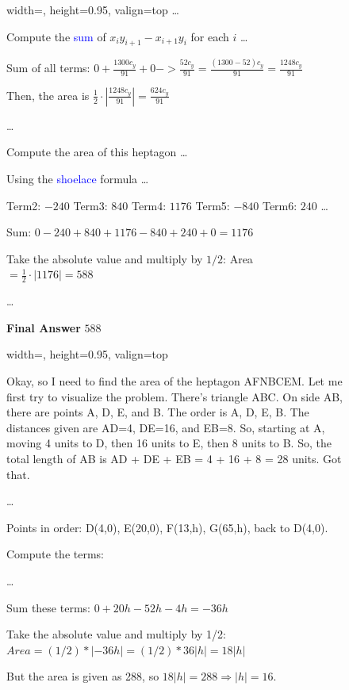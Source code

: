 \begin{figure}[t]
\begin{minipage}[t]{0.32\textwidth}
\begin{bluebox}{width=\linewidth,  
height=0.95\textheight,  valign=top}
\ldots

Compute the \textcolor{blue}{sum} of $x_i y_{i+1} - x_{i+1} y_i$ for each $i$ \ldots

Sum of all terms: $0 + \frac{1300 c_y}{91} + 0  -> \frac{52 c_y}{91} = \frac{(1300 - 52)c_y}{91} = \frac{1248 c_y}{91}$

Then, the area is $\frac{1}{2} \cdot \left|\frac{1248 c_y}{91}\right| = \frac{624 c_y}{91}$

\ldots

Compute the area of this heptagon \ldots 

Using the \textcolor{blue}{shoelace} formula \ldots

Term2: $-\!240$ \quad Term3: $840$ \quad Term4: $1176$ \quad Term5: $-\!840$ \quad Term6: $240$ \ldots

Sum: $0 - 240 + 840 + 1176 - 840 + 240 + 0 = 1176$

Take the absolute value and multiply by $1/2$:
Area $= \frac{1}{2}\cdot |1176| = 588$

\ldots

\textbf{Final Answer} $\boxed{588}$ \cmark

\end{bluebox}
\end{minipage}\hfill
\begin{minipage}[t]{0.32\textwidth}
\begin{bluebox}{width=\linewidth, 
height=0.95\textheight, valign=top}

\begingroup
\color{blue}
Okay, so I need to find the area of the heptagon AFNBCEM. Let me first try to visualize the problem. There's triangle ABC. On side AB, there are points A, D, E, and B. The order is A, D, E, B. The distances given are AD=4, DE=16, and EB=8. So, starting at A, moving 4 units to D, then 16 units to E, then 8 units to B. So, the total length of AB is AD + DE + EB = 4 + 16 + 8 = 28 units. Got that.

\ldots

Points in order: D(4,0), E(20,0), F(13,h), G(65,h), back to D(4,0).

Compute the terms:

\ldots

Sum these terms: $0 + 20h - 52h - 4h = -36h$

Take the absolute value and multiply by 1/2: $Area = (1/2)*| -36h | = (1/2)*36|h| = 18|h|$

But the area is given as 288, so $18|h| = 288 \Rightarrow |h| = 16$.


\end{bluebox}
\end{minipage}
\end{figure}
